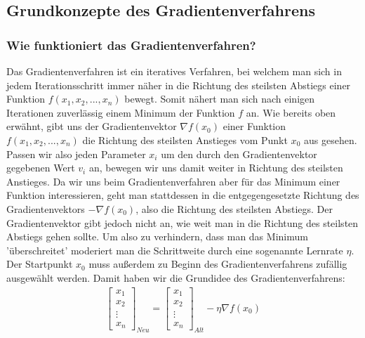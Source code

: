 \subsection{Grundkonzepte des Gradientenverfahrens}\label{subsec:gradientenverfahren:grundkonzepte}

\subsubsection{Wie funktioniert das Gradientenverfahren?}\label{subsec:gradientenverfahren:wie_funktioniert}
  Das Gradientenverfahren ist ein iteratives Verfahren, bei welchem man sich in jedem Iterationsschritt immer näher in die Richtung des
  steilsten Abstiegs einer Funktion $f(x_{1}, x_{2}, ... , x_{n})$ bewegt. Somit nähert man sich nach einigen Iterationen zuverlässig einem Minimum der Funktion $f$ an.
  \bigbreak\noindent
  Wie bereits oben erwähnt, gibt uns der Gradientenvektor $\nabla f(x_{0})$ einer Funktion $f(x_{1}, x_{2}, ... , x_{n})$ die Richtung des steilsten Anstieges vom Punkt $x_0$ aus gesehen.
  Passen wir also jeden Parameter $x_{i}$ um den durch den Gradientenvektor gegebenen Wert $v_{i}$ an, bewegen wir uns damit weiter in Richtung des steilsten Anstieges. 
  Da wir uns beim Gradientenverfahren aber für das Minimum einer Funktion interessieren, geht man stattdessen in die entgegengesetzte Richtung
  des Gradientenvektors $-\nabla f(x_{0})$, also die Richtung des steilsten Abstiegs. Der Gradientenvektor gibt jedoch nicht an, wie weit man in die Richtung des steilsten 
  Abstiegs gehen sollte. Um also zu verhindern, dass man das Minimum 'überschreitet' moderiert man die Schrittweite durch eine sogenannte Lernrate $\eta$.
  Der Startpunkt $x_{0}$ muss außerdem zu Beginn des Gradientenverfahrens zufällig ausgewählt werden.
  Damit haben wir die Grundidee des Gradientenverfahrens: 
  \begin{align*}
    \begin{bmatrix}
          x_{1}\\
          x_{2}\\
          \vdots \\
          x_{n}
         \end{bmatrix}_{Neu} = \begin{bmatrix}
          x_{1}\\
          x_{2}\\
          \vdots \\
          x_{n}
         \end{bmatrix}_{Alt} - \eta \nabla f(x_{0})
  \end{align*}
